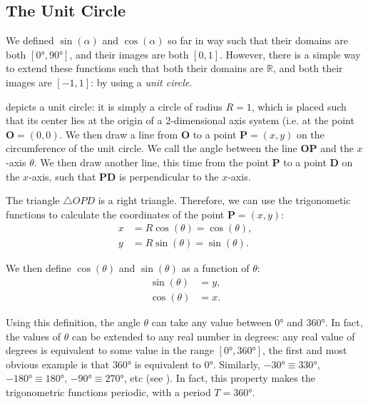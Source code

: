 \subsection{The Unit Circle}
We defined $\sin(\alpha)$ and $\cos(\alpha)$ so far in way such that their domains are both $[\ang{0},\ang{90}]$, and their images are both $[0,1]$. However, there is a simple way to extend these functions such that both their domains are $\mathbb{R}$, and both their images are $[-1,1]$: by using a \emph{unit circle}.

 depicts a unit circle: it is simply a circle of radius $R=1$, which is placed such that its center lies at the origin of a 2-dimensional axis system (i.e. at the point $\bm{O}=(0,0)$. We then draw a line from $\bm{O}$ to a point $\bm{P}=(x,y)$ on the circumference of the unit circle. We call the angle between the line $\bm{OP}$ and the $x$-axis $\theta$. We then draw another line, this time from the point $\bm{P}$ to a point $\bm{D}$ on the $x$-axis, such that $\bm{PD}$ is perpendicular to the $x$-axis.

The triangle $\triangle OPD$ is a right triangle. Therefore, we can use the trigonometic functions to calculate the coordinates of the point $\bm{P}=(x,y)$:
\begin{align}
	x &= R\cos(\theta) = \cos(\theta),\nonumber\\
	y &= R\sin(\theta) = \sin(\theta).
	\label{eq:xy_P}
\end{align}

We then define $\cos(\theta)$ and $\sin(\theta)$ as a function of $\theta$:
\begin{align}
	\sin(\theta) &= y,\nonumber\\
	\cos(\theta) &= x.
	\label{eq:unit circle definition of sin and cos}
\end{align}

Using this definition, the angle $\theta$ can take any value between $\ang{0}$ and $\ang{360}$. In fact, the values of $\theta$ can be extended to any real number in degrees: any real value of degrees is equivalent to some value in the range $[\ang{0},\ang{360}]$, the first and most obvious example is that $\ang{360}$ is equivalent to $\ang{0}$. Similarly, $\ang{-30}\equiv\ang{330}$, $-\ang{180}\equiv\ang{180}$, $-\ang{90}\equiv\ang{270}$, etc (see ). In fact, this property makes the trigonometric functions periodic, with a period $T=\ang{360}$.


